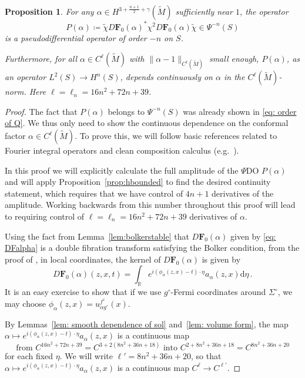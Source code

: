 \documentclass[11pt]{amsart}
\newtheorem{Proposition}[Theorem]{Proposition}
\theoremstyle{definition}
\numberwithin{equation}{section}
\newcommand{\mR}{\mathbb{R}}                    %
\newcommand{\norm}[1]{\lVert #1 \rVert}         %
\newcommand{\dd}{\mathrm{d}}
\begin{document}
\begin{Proposition}\label{prop:amplitudesketch}
For any $\alpha \in H^{3+\frac{n+1}{2}+\gamma}(\widetilde{M})$ sufficiently near $1$, the operator 
	\[
		P(\alpha) \coloneqq \tilde{\chi}D\mathbf{F}_0(\alpha)^\ast \chi^2 D\mathbf{F}_0(\alpha)\tilde{\chi} \in \Psi^{-n}(S)%
	\]
is a pseudodifferential operator of order $-n$ on $S$. 

Furthermore, for all $\alpha\in C^{\ell}(\widetilde{M})$ with $\norm{\alpha-1}_{C^{\ell}(\widetilde{M})}$ small enough, $P(\alpha)$, as an operator $L^2(S)\to H^n(S)$, depends continuously on $\alpha$ in the $C^{\ell}(\widetilde{M})$-norm. Here $\ell = \ell_n = 16n^2+72n+39$.
\end{Proposition}
\begin{proof}
The fact that $P(\alpha)$ belongs to $\Psi^{-n}(S)$ was already shown in \eqref{eq: order of Q}. We thus only need to show the continuous dependence on the conformal factor $\alpha \in C^{\ell}(\widetilde M)$. To prove this, we will follow basic references related to Fourier integral operators and clean composition calculus (e.g.\ \cite{zbMATH03481135, zbMATH05528184, zbMATH05817029}).

In this proof we will explicitly calculate the full amplitude of the $\Psi$DO $P(\alpha)$ and will apply Proposition~\ref{prop:hbounded} to find the desired continuity statement, which requires that we have control of $4n+1$ derivatives of the amplitude. Working backwards from this number throughout this proof will lead to requiring control of $\ell = \ell_n = 16n^2+72n+39$ derivatives of $\alpha$.
	
Using the fact from Lemma~\ref{lem:bolkerstable} that $D\mathbf{F}_0(\alpha)$ given by \eqref{eq: DFalpha} is a double fibration transform satisfying the Bolker condition, from the proof of \cite[Thm.~2.2]{MST}, in local coordinates, the kernel of $D\mathbf{F}_0(\alpha)$ is given by
	\begin{equation}\label{eq:myFIO}
		D\mathbf{F}_0(\alpha)(z,x,t)= \int_{\mR} e^{i(\phi_\alpha(z,x)-t)\cdot\eta} a_\alpha(z,x)\dd \eta\,.
	\end{equation}
It is an easy exercise to show that if we use $g^\circ$-Fermi coordinates around $\Sigma^\circ$, we may choose $\phi_\alpha(z,x) = u_{\alpha g^\circ}^{f^z}(x)$. 

By Lemmas~\ref{lem: smooth dependence of sol} and~\ref{lem: volume form}, the map $\alpha \mapsto e^{i(\phi_\alpha(z,x)-t)\cdot\eta} a_\alpha(z,x)$ is a continuous map 
\[
\text{from } C^{16n^2+72n+39} = C^{3+2(8n^2+36n+18)} \text{ into } C^{2+ 8n^2+36n+18} = C^{8n^2+36n+20}
\]
for each fixed $\eta$. We will write $\ell' = 8n^2+36n+20$, so that $\alpha \mapsto e^{i(\phi_\alpha(z,x)-t)\cdot\eta} a_\alpha(z,x)$ is a continuous map $C^{\ell} \to C^{\ell'}$.
	

\end{proof}
\end{document}
